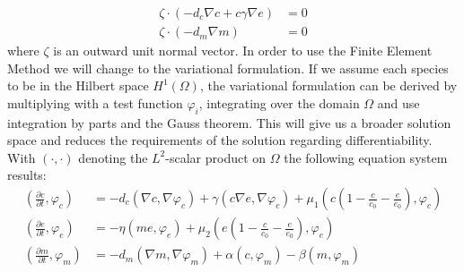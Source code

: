 \begin{align}
	\zeta \cdot (-d_c \nabla c + c \gamma \nabla e) &= 0\label{eq:9}\\
	\zeta \cdot (-d_m\nabla m ) &= 0\label{eq:10}
\end{align}
where $\zeta$ is an outward unit normal vector.\newline 
In order to use the Finite Element Method we will change to the variational formulation. If we assume each species to be in the Hilbert space $H^1(\Omega)$, the variational formulation can be derived by multiplying with a test function $\varphi_i$, integrating over the domain $\Omega$ and use integration by parts and the Gauss theorem. This will give us a broader solution space and reduces the requirements of the solution regarding differentiability. With $\left(\cdot, \cdot\right)$ denoting the $L^2$-scalar product on $\Omega$ the following equation system results:
\begin{align}
    \left(\frac{\partial c}{\partial t}, \varphi_c\right) &=
        - d_c\left(\nabla c, \nabla \varphi_c\right) + \gamma \left(c\nabla e, \nabla \varphi_c\right) + \mu_1 \left(c \left(1-\frac{c}{c_0} - \frac{e}{e_0}\right), \varphi_c\right) \label{eq:11}\\
    \left(\frac{\partial e}{\partial t}, \varphi_e\right) &=  -\eta \left( me, \varphi_e\right) + \mu_2 \left(e\left(1-\frac{c}{c_0}-\frac{e}{e_0}\right),\varphi_e\right) \label{eq:12}\\
    \left(\frac{\partial m}{\partial t}, \varphi_m\right) &= -d_m \left(\nabla m,\nabla \varphi_m\right) + \alpha \left(c,\varphi_m\right) - \beta \left(m,\varphi_m\right) \label{eq:13}
\end{align}

